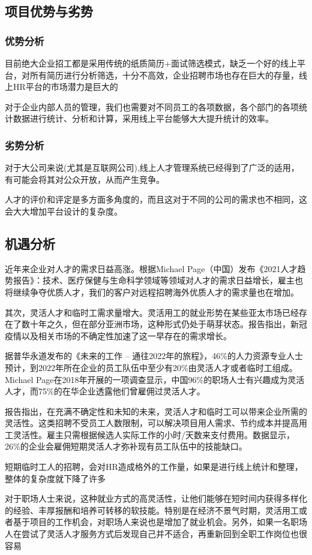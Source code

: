 \documentclass[UTF8]{ctexart}
\begin{document}
\subsection{项目优势与劣势}
\subsubsection{优势分析}
目前绝大企业招工都是采用传统的纸质简历+面试筛选模式，缺乏一个好的线上平台，对所有简历进行分析筛选，十分不高效，企业招聘市场也存在巨大的存量，线上HR平台的市场潜力是巨大的

对于企业内部人员的管理，我们也需要对不同员工的各项数据，各个部门的各项统计数据进行统计、分析和计算，采用线上平台能够大大提升统计的效率。
\subsubsection{劣势分析}
对于大公司来说(尤其是互联网公司),线上人才管理系统已经得到了广泛的适用，有可能会将其对公众开放，从而产生竞争。

人才的评价和评定是多方面多角度的，而且这对于不同的公司的需求也不相同，这会大大增加平台设计的复杂度。
\subsection{机遇分析}
近年来企业对人才的需求日益高涨。根据Michael Page（中国）发布《2021人才趋势报告》：技术、医疗保健与生命科学领域等领域对人才的需求日益增长，雇主也将继续争夺优质人才，我们的客户对远程招聘海外优质人才的需求量也在增加。

其次，灵活人才和临时工需求量增大。灵活用工的就业形势在某些亚太市场已经存在了数十年之久，但在部分亚洲市场，这种形式仍处于萌芽状态。报告指出，新冠疫情以及相关市场的不确定性加速了这一早存在的需求增长。

据普华永道发布的《未来的工作 – 通往2022年的旅程》，46\%的人力资源专业人士预计，到2022年所在企业的员工队伍中至少有20\%由灵活人才或者临时工组成。Michael Page在2018年开展的一项调查显示，中国96\%的职场人士有兴趣成为灵活人才，而75\%的在华企业透露他们曾雇佣过灵活人才。

报告指出，在充满不确定性和未知的未来，灵活人才和临时工可以带来企业所需的灵活性。这类招聘不受员工人数限制，可以解决项目用人需求、节约成本并提高用工灵活性。雇主只需根据候选人实际工作的小时/天数来支付费用。数据显示，26\%的企业会雇佣短期灵活人才弥补现有员工队伍中的技能缺口。

短期临时工人的招聘，会对HR造成格外的工作量，如果是进行线上统计和整理，整体的复杂度就下降了许多

对于职场人士来说，这种就业方式的高灵活性，让他们能够在短时间内获得多样化的经验、丰厚报酬和培养可转移的软技能。特别是在经济不景气时期，灵活用工或者基于项目的工作机会，对职场人来说也是增加了就业机会。另外，如果一名职场人在尝试了灵活人才服务方式后发现自己并不适合，再重新回到全职工作岗位也很容易
\end{document}
